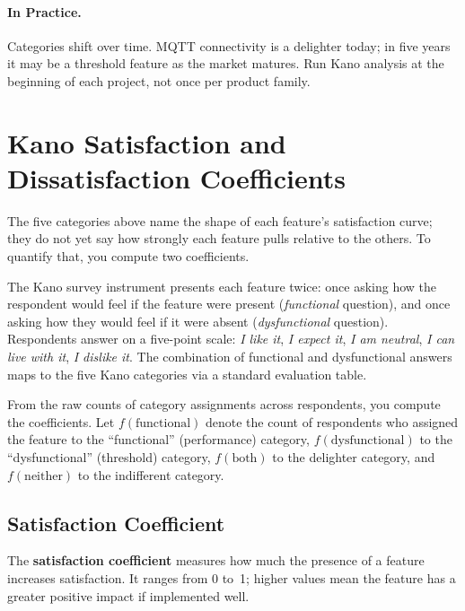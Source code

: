 \paragraph{In Practice.}
Categories shift over time.
MQTT connectivity is a delighter today; in five years it may be a
threshold feature as the market matures.
Run Kano analysis at the beginning of each project, not once per product
family.

\section{Kano Satisfaction and Dissatisfaction Coefficients}
\label{sec:ch2-coefficients}

The five categories above name the shape of each feature's satisfaction
curve; they do not yet say how strongly each feature pulls relative to
the others.
To quantify that, you compute two coefficients.

The Kano survey instrument presents each feature twice: once asking how
the respondent would feel if the feature were present (\emph{functional}
question), and once asking how they would feel if it were absent
(\emph{dysfunctional} question).
Respondents answer on a five-point scale: \emph{I like it},
\emph{I expect it}, \emph{I am neutral}, \emph{I can live with it},
\emph{I dislike it}.
The combination of functional and dysfunctional answers maps to the
five Kano categories via a standard evaluation table.

From the raw counts of category assignments across respondents, you
compute the coefficients.
Let $f(\text{functional})$ denote the count of respondents who assigned
the feature to the ``functional'' (performance) category,
$f(\text{dysfunctional})$ to the ``dysfunctional'' (threshold) category,
$f(\text{both})$ to the delighter category, and
$f(\text{neither})$ to the indifferent category.

\subsection{Satisfaction Coefficient}
\label{subsec:ch2-cs}

The \textbf{satisfaction coefficient} measures how much the presence of
a feature increases satisfaction.
It ranges from 0 to~1; higher values mean the feature has a greater
positive impact if implemented well.

